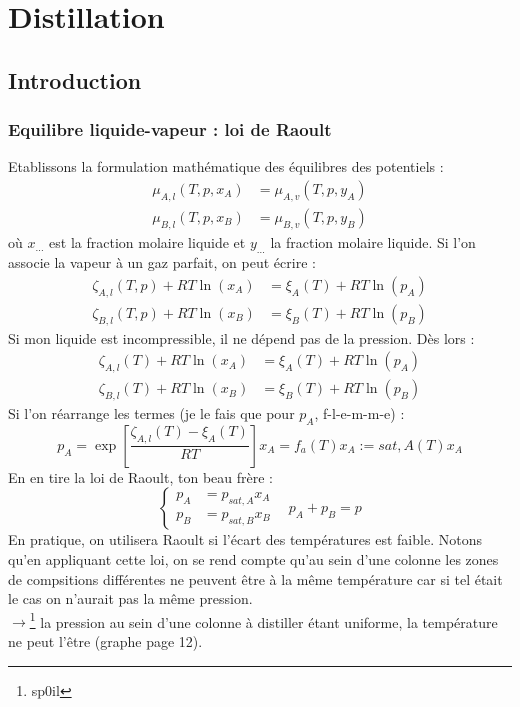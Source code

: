 \documentclass[11pt, a4paper, openany]{book}
\begin{document}
\chapter{Distillation}
\section{Introduction}
	\subsection{Equilibre liquide-vapeur : loi de Raoult}
	Etablissons la formulation mathématique des équilibres des potentiels :
	\begin{equation}
	\begin{array}{ll}
	\mu_{A,l}(T,p,x_A) &= \mu_{A,v}(T,p,y_A)\\
	\mu_{B,l}(T,p,x_B) &= \mu_{B,v}(T,p,y_B)
	\end{array}
	\end{equation}
	où $x_{\dots}$ est la fraction molaire liquide et $y_{\dots}$ la fraction molaire 
	liquide. Si l'on associe la vapeur à un gaz parfait, on peut écrire :
	\begin{equation}
	\begin{array}{ll}
	\zeta_{A,l} (T,p) + RT\ln(x_A) &= \xi_A(T) + RT\ln(p_A)\\
	\zeta_{B,l} (T,p) + RT\ln(x_B) &= \xi_B(T) + RT\ln(p_B)	
	\end{array}
	\end{equation}
	Si mon liquide est incompressible, il ne dépend pas de la pression. Dès lors :
	\begin{equation}
	\begin{array}{ll}
	\zeta_{A,l} (T) + RT\ln(x_A) &= \xi_A(T) + RT\ln(p_A)\\
	\zeta_{B,l} (T) + RT\ln(x_B) &= \xi_B(T) + RT\ln(p_B)	
	\end{array}
	\end{equation}
	Si l'on réarrange les termes (je le fais que pour $p_A$, f-l-e-m-m-e) :
	\begin{equation}
	p_A = \exp\left[\dfrac{\zeta_{A,l}(T)-\xi_A(T)}{RT}\right]x_A = f_a(T)x_A :=
	{sat,A}(T)x_A
	\end{equation}
	En en tire la loi de Raoult, ton beau frère :
	\begin{equation}
	\left\{\begin{array}{ll}
	p_A &= p_{sat,A}x_A\\
	p_B &= p_{sat,B}x_B
	\end{array}\right.\ \ \ \ p_A+p_B=p
	\end{equation}
	En pratique, on utilisera Raoult si l'écart des températures est faible. Notons 
	qu'en appliquant cette loi, on se rend compte qu'au sein d'une colonne les zones 
	de compsitions différentes ne peuvent être à la même température car si tel était 
	le cas on n'aurait pas la même pression.\\
	$\rightarrow$\footnote{sp0il} la pression au sein d'une colonne à distiller étant 
	uniforme, la température ne peut l'être (graphe page 12).\\
	
\end{document}
